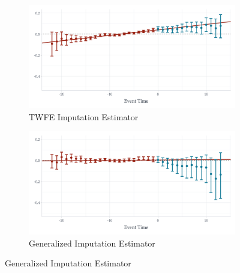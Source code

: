 \documentclass[12pt]{article}
\begin{document}
\begin{figure}
\caption{Effect of Walmart on County $\log$ wholesale Employment}
\label{fig:walmart_wholesale}

\begin{center}
\begin{subfigure}[b]{0.75\textwidth}
  \caption{TWFE Imputation Estimator}
  \begin{adjustbox}{width=\textwidth, center}
    \includegraphics{figures/did2s_wholesale.pdf}
  \end{adjustbox}
\end{subfigure}
\end{center}
\begin{center}
\begin{subfigure}[b]{0.75\textwidth}
  \caption{Generalized Imputation Estimator}
  \begin{adjustbox}{width=\textwidth, center}
    \includegraphics{figures/qld_wholesale.pdf}
  \end{adjustbox}
\end{subfigure}
\end{center}


\end{figure}
\end{document}
